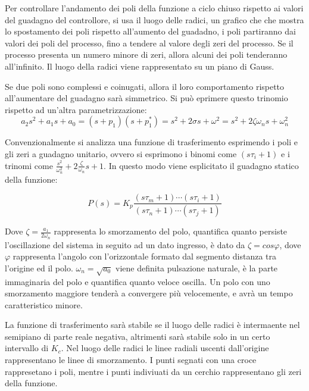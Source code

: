 \documentclass{article}
\numberwithin{equation}{subsection}
\begin{document}
Per controllare l'andamento dei poli della funzione a ciclo chiuso rispetto ai valori del guadagno del controllore, si usa il luogo delle radici, un 
grafico che che mostra lo spostamento dei poli rispetto all'aumento del guadadno, i poli partiranno dai valori dei poli del processo, fino a tendere 
al valore degli zeri del processo. Se il processo presenta un numero minore di zeri, allora alcuni dei poli tenderanno all'infinito. 
Il luogo della radici viene rappresentato su un piano di Gauss. 


Se due poli sono complessi e coinugati, allora il loro comportamento rispetto all'aumentare del guadagno sarà simmetrico. Si può eprimere questo trinomio rispetto ad 
un'altra parametrizzazione:
\begin{equation}
    a_2s^2+a_1s+a_0=(s+p_1)(s+p_1^*)=s^2+2\sigma s+\omega^2=s^2+2\zeta\omega_ns+\omega_n^2
\end{equation}

Convenzionalmente si analizza una funzione di trasferimento esprimendo i poli e gli zeri a guadagno unitario, ovvero si esprimono i binomi come $(s\tau_i+1)$ e i trinomi 
come $\displaystyle\frac{s^2}{\omega_n^2}+2\frac{\zeta}{\omega_n}s+1$. In questo modo viene esplicitato il guadagno statico della funzione:

\begin{equation}
    P(s)=K_p\displaystyle\frac{(s\tau_m+1)\cdots(s\tau_i+1)}{(s\tau_n+1)\cdots(s\tau_j+1)}
\end{equation}


Dove $\zeta=\displaystyle\frac{a_1}{2\omega_n}$ rappresenta lo smorzamento del polo, quantifica quanto persiste l'oscillazione del sistema in seguito ad un dato ingresso, è dato da 
$\zeta=cos\varphi$, dove $\varphi$ rappresenta l'angolo con l'orizzontale formato dal segmento distanza tra l'origine ed il polo. 
$\omega_n=\displaystyle\sqrt{a_0}$ viene definita pulsazione naturale, è la parte immaginaria del polo e quantifica quanto veloce oscilla. 
Un polo con uno smorzamento maggiore tenderà a convergere più velocemente, e avrà un tempo caratteristico minore. 



La funzione di trasferimento sarà stabile se il luogo delle radici è intermaente nel semipiano di parte reale negativa, altrimenti sarà stabile solo 
in un certo intervallo di $K_c$. Nel luogo delle radici le linee radiali uscenti dall'origine rappresentano le linee di smorzamento. 
I punti segnati con una croce rappresetano i poli, mentre i punti indiviuati da un cerchio rappresentano gli zeri della funzione.
\end{document}
